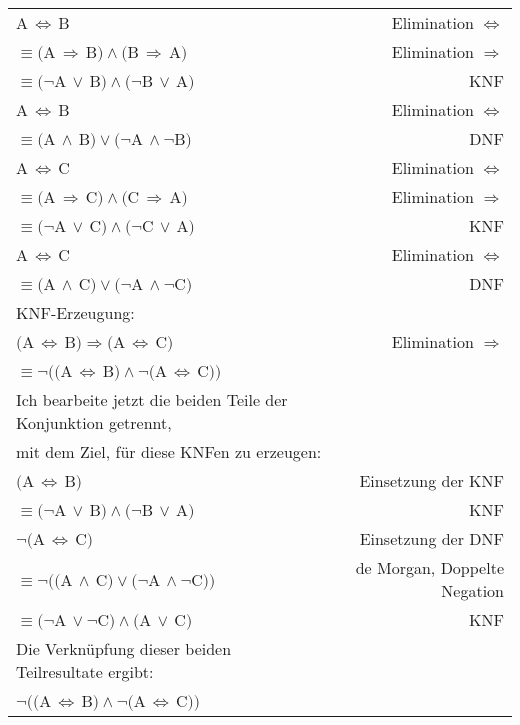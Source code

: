 \documentclass[10pt,a4paper,oneside,ngerman,numbers=noenddot]{scrartcl}
\begin{document}
\subsection{} %
\begin{tabular}{lr}
A$\, \Leftrightarrow \,$B & Elimination $\Leftrightarrow$ \\
$\equiv ($A$\, \Rightarrow \,$B$) \wedge ($B$ \, \Rightarrow \,$A$)$ & Elimination $\Rightarrow$ \\
$\equiv (\neg$A$\, \vee \,$B$) \wedge (\neg$B$\, \vee \,$A$)$ & KNF \\
A$\, \Leftrightarrow \,$B & Elimination $\Leftrightarrow$ \\
$\equiv ($A$\, \wedge \,$B$) \vee (\neg$A$\, \wedge \neg$B$)$ & DNF \\
A$\, \Leftrightarrow \,$C & Elimination $\Leftrightarrow$ \\
$\equiv ($A$\, \Rightarrow \,$C$) \wedge ($C$ \, \Rightarrow \,$A$)$ & Elimination $\Rightarrow$ \\
$\equiv (\neg$A$\, \vee \,$C$) \wedge (\neg$C$\, \vee \,$A$)$ & KNF \\
A$\, \Leftrightarrow \,$C & Elimination $\Leftrightarrow$ \\
$\equiv ($A$\, \wedge \,$C$) \vee (\neg$A$\, \wedge \neg$C$)$ & DNF \\
KNF-Erzeugung: \\
$($A$\, \Leftrightarrow \,$B$) \Rightarrow ($A$\, \Leftrightarrow \,$C$)$ & Elimination $\Rightarrow$ \\
$\equiv \neg(($A$\, \Leftrightarrow \,$B$) \wedge \neg($A$\, \Leftrightarrow \,$C$))$ \\
Ich bearbeite jetzt die beiden Teile der Konjunktion getrennt, \\
mit dem Ziel, für diese KNFen zu erzeugen:\\
$($A$\, \Leftrightarrow \,$B$)$ & Einsetzung der KNF \\
$\equiv (\neg$A$\, \vee \,$B$) \wedge (\neg$B$\, \vee \,$A$)$ & KNF\\
$\neg($A$\, \Leftrightarrow \,$C$)$ & Einsetzung der DNF \\
$\equiv \neg(($A$\, \wedge \,$C$) \vee (\neg$A$\, \wedge \neg$C$))$ & de Morgan, Doppelte Negation \\
$\equiv (\neg$A$\, \vee \neg$C$) \wedge ($A$\, \vee \,$C$)$ & KNF \\
Die Verknüpfung dieser beiden Teilresultate ergibt: \\
$\neg(($A$\, \Leftrightarrow \,$B$) \wedge \neg($A$\, \Leftrightarrow \,$C$))$ \\

\end{tabular}
\end{document}
